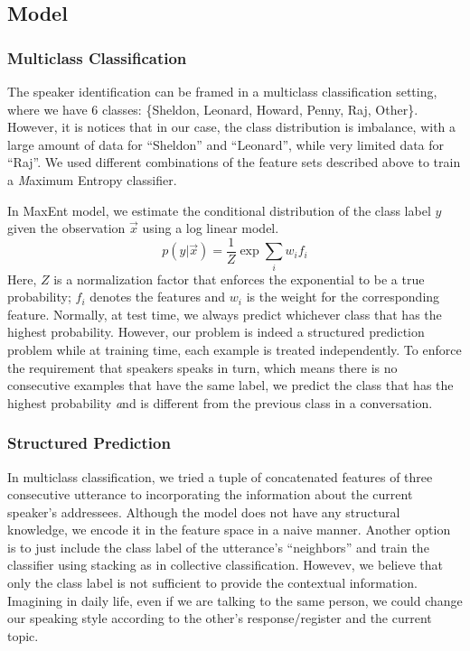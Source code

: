 \documentclass[11pt,letterpaper]{article}
\begin{document}
\subsection{Model}
\subsubsection{Multiclass Classification}
The speaker identification can be framed in a multiclass classification setting, where we have 6 classes:
\{Sheldon, Leonard, Howard, Penny, Raj, Other\}. However, it is notices that in our case, the class distribution
is imbalance, with a large amount of data for ``Sheldon'' and ``Leonard'', while very limited data for ``Raj''. 
We used different combinations of the feature sets described above to train a {\emph Maximum Entropy} classifier.

In MaxEnt model, we estimate the conditional distribution of the class label $y$ given the observation $\vec x$
using a log linear model.
\begin{equation}
p(y|\vec x)=\frac{1}{Z}\exp\sum_i w_i f_i
\end{equation}
Here, $Z$ is a normalization factor that enforces the exponential to be a true probability; 
$f_i$ denotes the features and $w_i$ is the weight for the corresponding feature.
Normally, at test time, we always predict whichever class that has the highest probability. 
However, our problem is indeed a structured prediction problem while at training time, each example is treated
independently. To enforce the requirement that speakers speaks in turn, which means there is no consecutive
examples that have the same label, we predict the class that has the highest probability {\emph and} is 
different from the previous class in a conversation.

\subsubsection{Structured Prediction}
In multiclass classification, we tried a tuple of concatenated features of three consecutive utterance 
to incorporating the information about the current speaker's addressees. Although the model does not
have any structural knowledge, we encode it in the feature space in a naive manner. 
Another option is to just include the class label of the utterance's ``neighbors'' and train the classifier
using stacking as in collective classification. Howevev, we believe that only the class label is not 
sufficient to provide the contextual information. Imagining in daily life, even if we are talking to 
the same person, we could change our speaking style according to the other's response/register and 
the current topic.
\end{document}
